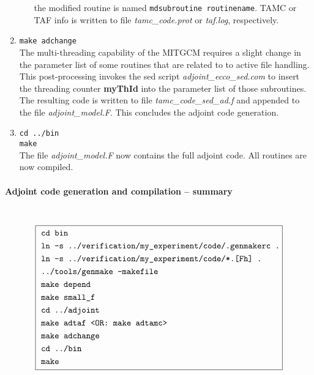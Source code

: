\begin{enumerate}
\begin{enumerate}
the modified routine is named {\tt mdsubroutine routinename}.
TAMC or TAF info is written to file
{\it tamc\_code.prot} or {\it taf.log}, respectively.
%
\end{enumerate}
%
\item
{\tt make adchange} \\
The multi-threading capability of the MITGCM requires a slight
change in the parameter list of some routines that are related to
to active file handling.
This post-processing invokes the sed script {\it adjoint\_ecco\_sed.com}
to insert the threading counter {\bf myThId} into the parameter list
of those subroutines.
The resulting code is written to file {\it tamc\_code\_sed\_ad.f}
and appended to the file {\it adjoint\_model.F}.
This concludes the adjoint code generation.
%
\item
{\tt cd ../bin} \\
{\tt make} \\
The file {\it adjoint\_model.F} now contains the full adjoint code.
All routines are now compiled.
%
\end{enumerate}

\paragraph{Adjoint code generation and compilation -- summary}
~ \\

\[
\boxed{
\begin{split}
 ~ & \mbox{\tt cd bin} \\
 ~ & \mbox{\tt ln -s ../verification/my\_experiment/code/.genmakerc .} \\
 ~ & \mbox{\tt ln -s ../verification/my\_experiment/code/*.[Fh] .} \\
 ~ & \mbox{\tt ../tools/genmake -makefile} \\
 ~ & \mbox{\tt make depend} \\
 ~ & \mbox{\tt make small\_f} \\
 ~ & \mbox{\tt cd ../adjoint} \\
 ~ & \mbox{\tt make adtaf <OR: make adtamc>} \\
 ~ & \mbox{\tt make adchange} \\
 ~ & \mbox{\tt cd ../bin} \\
 ~ & \mbox{\tt make} \\
\end{split}
}
\]

